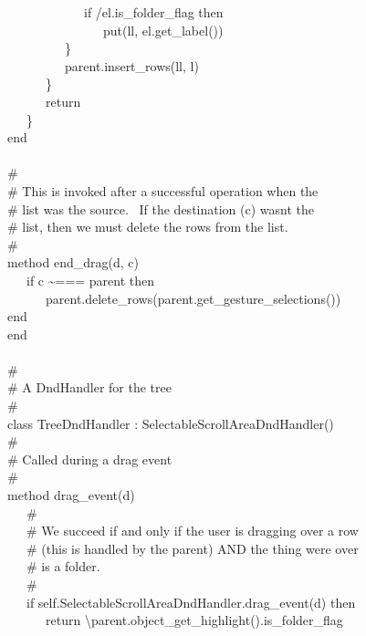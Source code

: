 {\>   \ \ \ \ \ \ \ \ \ \ \ \ if /el.is\_folder\_flag then \\
\>   \ \ \ \ \ \ \ \ \ \ \ \ \ \ \ put(ll, el.get\_label()) \\
\>   \ \ \ \ \ \ \ \ \ \} \\
\>   \ \ \ \ \ \ \ \ \ parent.insert\_rows(ll, l) \\
\>   \ \ \ \ \ \ \} \\
\>   \ \ \ \ \ \ return \\
\>   \ \ \ \} \\
\>   end \\
\ \\
\>   \# \\
\>   \# This is invoked after a successful operation when the \\
\>   \# list was the source. \ If the destination (c)
wasn{\textquotesingle}t the \\
\>   \# list, then we must delete the rows from the list. \\
\>   \# \\
\>   method end\_drag(d, c) \\
\>   \ \ \ if c \~{}=== parent then \\
\>   \ \ \ \ \ \ parent.delete\_rows(parent.get\_gesture\_selections()) \\
\>   end \\
end \\
\ \\
\# \\
\# A DndHandler for the tree \\
\# \\
class TreeDndHandler : SelectableScrollAreaDndHandler() \\
\>   \# \\
\>   \# Called during a drag event \\
\>   \# \\
\>   method drag\_event(d) \\
\>   \ \ \ \# \\
\>   \ \ \ \# We succeed if and only if the user is dragging over a
row \\
\>   \ \ \ \# (this is handled by the parent) AND the thing
we{\textquotesingle}re over \\
\>   \ \ \ \# is a folder. \\
\>   \ \ \ \# \\
\>   \ \ \ if self.SelectableScrollAreaDndHandler.drag\_event(d) then \\
\>   \ \ \ \ \ \ return
{\textbackslash}parent.object\_get\_highlight().is\_folder\_flag \\
}
